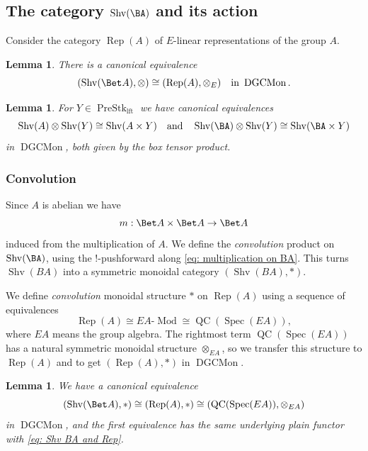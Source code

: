 \documentclass[10pt]{amsart}
\newcommand{\sssec}{\subsubsection}
\newtheorem{lemma}[subsubsection]{Lemma}
\theoremstyle{remark}
\newcommand{\te}{\text}
\newcommand{\on}{\operatorname}
\newcommand{\DGCatSymMon}{\on{DGCMon}}
\newcommand{\lMod}{\text{-}\on{Mod}}
\newcommand{\Rep}{\on{Rep}}
\newcommand{\QC}{\on{QC}}
\newcommand{\Shv}{\on{Shv}}
\newcommand{\PreStklft}{\on{PreStk}_{\on{lft}}}
\DeclareMathOperator{\Spec}{Spec}
\begin{document}
\subsection{The category $\Shv(\BA)$ and its action}
Consider the category $\Rep(A)$ of $E$-linear representations of the group $A$.
\begin{lemma}
    There is a canonical equivalence 
    \begin{equation}\label{eq: Shv BA and Rep}
        (\Shv(\Bet A),\otimes)\cong (\Rep(A),\otimes_E)\quad\te{in } \DGCatSymMon.
    \end{equation}
\end{lemma}

\begin{lemma}
    For $Y\in\PreStklft$ we have canonical equivalences
\[\Shv(A)\otimes\Shv(Y)\cong \Shv(A\times Y)\quad\te{and}\quad \Shv(\BA)\otimes\Shv(Y)\cong \Shv(\BA\times Y)\]
     in $\DGCatSymMon$, both given by the box tensor product.
\end{lemma}


\sssec{Convolution}
Since $A$ is abelian we have 
\begin{equation}\label{eq: multiplication on BA}
    m:\Bet A\times \Bet A\rightarrow \Bet A
\end{equation}
induced from the multiplication of $A$. We define the \emph{convolution} product on $\Shv(\BA)$, using the $!$-pushforward along \eqref{eq: multiplication on BA}. This turns $\Shv(BA)$ into a symmetric monoidal category $(\Shv(BA),\ast)$.
\medskip

We define \emph{convolution} monoidal structure $\ast$ on $\Rep(A)$ using a sequence of equivalences
\begin{equation}\label{eq: equivalences Rep A}
    \Rep(A)\cong EA\lMod\cong \QC(\Spec(EA)),
\end{equation}
where $EA$ means the group algebra.
The rightmost term $\QC(\Spec(EA))$ has a natural symmetric monoidal structure $\otimes_{EA}$, so we transfer this structure to $\Rep(A)$ and to get $(\Rep(A),\ast)$ in $\DGCatSymMon$.

\begin{lemma}
    We have a canonical equivalence
    \begin{equation}\label{eq: Shv BA and Rep convolution}
        (\Shv(\Bet A),\ast)\cong (\Rep(A),\ast) \cong (\QC(\Spec(EA)),\otimes_{EA})
    \end{equation}
    in $\DGCatSymMon$, and the first equivalence has the same underlying plain functor with \eqref{eq: Shv BA and Rep}.
\end{lemma}
\end{document}
